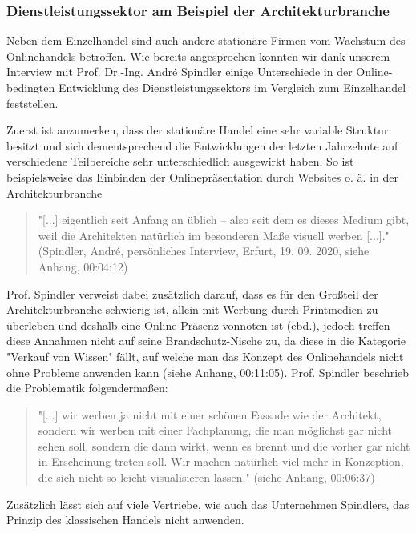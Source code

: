 \documentclass[a4paper, 12pt]{scrartcl}
\makeatletter
\newenvironment{folding}{\endgroup}{\begingroup \def \@currenvir{folding}\edef \@currenvline{\on@line}}
\makeatother
\begin{document}
\begin{folding} \subsubsection{Dienstleistungssektor am Beispiel der Architekturbranche}

Neben dem Einzelhandel sind auch andere stationäre Firmen vom Wachstum des Onlinehandels betroffen. Wie bereits angesprochen konnten wir dank unserem Interview mit Prof. Dr.-Ing. André Spindler einige Unterschiede in der Online-bedingten Entwicklung des Dienstleistungssektors im Vergleich zum Einzelhandel feststellen.

Zuerst ist anzumerken, dass der stationäre Handel eine sehr variable Struktur besitzt und sich dementsprechend die Entwicklungen der letzten Jahrzehnte auf verschiedene Teilbereiche sehr unterschiedlich ausgewirkt haben. So ist beispielsweise das Einbinden der Onlinepräsentation durch Websites o. ä. in der Architekturbranche

\begin{quote}
"[...] eigentlich seit Anfang an üblich – also seit dem es dieses Medium gibt, weil die Architekten natürlich im besonderen Maße visuell werben [...]." (Spindler, André, persönliches Interview, Erfurt, 19. 09. 2020, siehe Anhang, 00:04:12)
\end{quote} 
Prof. Spindler verweist dabei zusätzlich darauf, dass es für den Großteil der Architekturbranche schwierig ist, allein mit Werbung durch Printmedien zu überleben und deshalb eine Online-Präsenz vonnöten ist (ebd.), jedoch treffen diese Annahmen nicht auf seine Brandschutz-Nische zu, da diese in die Kategorie "Verkauf von Wissen" fällt, auf welche man das Konzept des Onlinehandels nicht ohne Probleme anwenden kann (siehe Anhang, 00:11:05). Prof. Spindler beschrieb die Problematik folgendermaßen:
\begin{quote}
"[...] wir werben ja nicht mit einer schönen Fassade wie der Architekt, sondern wir werben mit einer Fachplanung, die man möglichst gar nicht sehen soll, sondern die dann wirkt, wenn es brennt und die vorher gar nicht in Erscheinung treten soll. Wir machen natürlich viel mehr in Konzeption, die sich nicht so leicht visualisieren lassen." (siehe Anhang, 00:06:37)
\end{quote} 
Zusätzlich lässt sich auf viele Vertriebe, wie auch das Unternehmen Spindlers, das Prinzip des klassischen Handels nicht anwenden. 


\end{folding}
\end{document}
